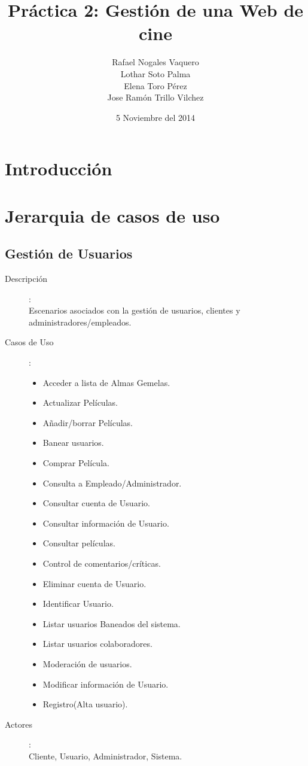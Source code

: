 \documentclass{article}
\title{Práctica 2: Gestión de una Web de cine}
\author{Rafael Nogales Vaquero
\\Lothar Soto Palma
\\Elena Toro Pérez
\\Jose Ramón Trillo Vilchez}
\date{5 Noviembre del 2014}
\begin{document}
\maketitle

\section{Introducción}
\section{Jerarquia de casos de uso}
\subsection*{Gestión de Usuarios}
	\begin{description}
	\item[Descripción]:\\ Escenarios asociados con la gestión de usuarios, clientes y administradores/empleados.
	\item[Casos de Uso]: 
	\begin{itemize}
		\item Acceder a lista de Almas Gemelas.
		\item Actualizar Películas. 
		\item Añadir/borrar Películas.  %
		\item Banear usuarios.		   %
		\item Comprar Película.			%
		\item Consulta a Empleado/Administrador. %
		\item Consultar cuenta de Usuario. %
		\item Consultar información de Usuario. %
		\item Consultar películas. %
		\item Control de comentarios/críticas. %
		\item Eliminar cuenta de Usuario. %
		\item Identificar Usuario.		%
		\item Listar usuarios Baneados del sistema.
		\item Listar usuarios colaboradores.
		\item Moderación de usuarios.
		\item Modificar información de Usuario.
		\item Registro(Alta usuario).
\end{itemize}	 
	\item[Actores]:\\ Cliente, Usuario, Administrador, Sistema.
	\end{description}
	
\end{document}
